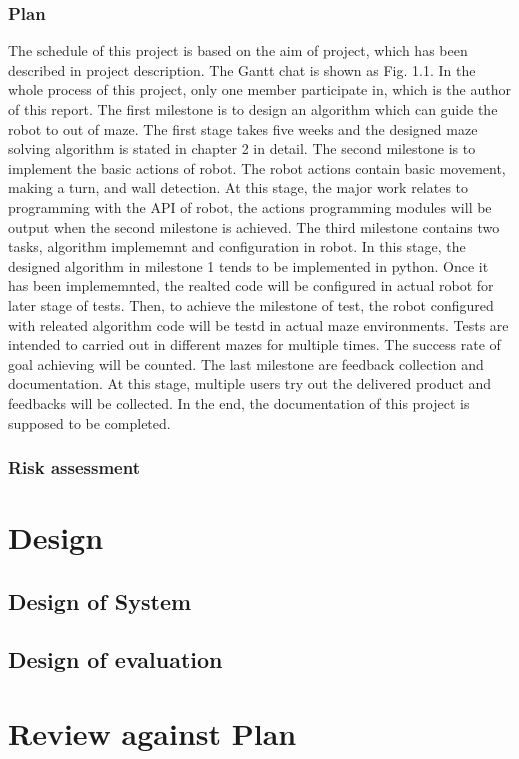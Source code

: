 \documentclass[11pt,times,oneside,openright,hardcopy]{eeereport}
\begin{document}
\subsection{Plan}
The schedule of this project is based on the aim of project, which has been described in project description. The Gantt chat is shown as Fig. 1.1. In the whole process of this project, only one member participate in, which is the author of this report.
The first milestone is to design an algorithm which can guide the robot to out of maze. The first stage takes five weeks and the designed maze solving algorithm is stated in chapter 2 in detail. 
The second milestone is to implement the basic actions of robot. The robot actions contain basic movement, making a turn, and wall detection. At this stage, the major work relates to programming with the API of robot, the actions programming modules will be output when the second milestone is achieved.
The third milestone contains two tasks, algorithm implememnt and configuration in robot. In this stage, the designed algorithm in milestone 1 tends to be implemented in python. Once it has been implememnted, the realted code will be configured in actual robot for later stage of tests. 
Then, to achieve the milestone of test, the robot configured with releated algorithm code will be testd in actual maze environments. Tests are intended to carried out in different mazes for multiple times. The success rate of goal achieving will be counted.
The last milestone are feedback collection and documentation. At this stage, multiple users try out the delivered product and feedbacks will be collected. In the end, the documentation of this project is supposed to be completed.
\subsection{Risk assessment}



\chapter{Design}\label{cpt:des}
\section{Design of System}
\section{Design of evaluation}

\chapter{Review against Plan}






\end{document}
